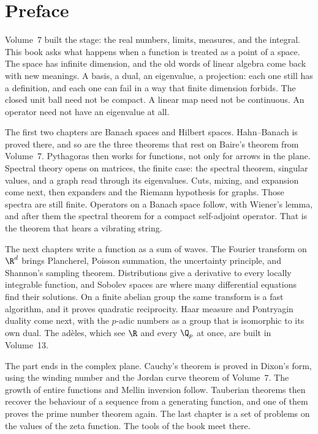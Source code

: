 \chapter*{Preface}
Volume~7 built the stage: the real numbers, limits, measures, and the integral. This book asks what happens when a function is treated as a point of a space. The space has infinite dimension, and the old words of linear algebra come back with new meanings. A basis, a dual, an eigenvalue, a projection: each one still has a definition, and each one can fail in a way that finite dimension forbids. The closed unit ball need not be compact. A linear map need not be continuous. An operator need not have an eigenvalue at all.

The first two chapters are Banach spaces and Hilbert spaces. Hahn--Banach is proved there, and so are the three theorems that rest on Baire's theorem from Volume~7. Pythagoras then works for functions, not only for arrows in the plane. Spectral theory opens on matrices, the finite case: the spectral theorem, singular values, and a graph read through its eigenvalues. Cuts, mixing, and expansion come next, then expanders and the Riemann hypothesis for graphs. Those spectra are still finite. Operators on a Banach space follow, with Wiener's lemma, and after them the spectral theorem for a compact self-adjoint operator. That is the theorem that hears a vibrating string.

The next chapters write a function as a sum of waves. The Fourier transform on $\R^d$ brings Plancherel, Poisson summation, the uncertainty principle, and Shannon's sampling theorem. Distributions give a derivative to every locally integrable function, and Sobolev spaces are where many differential equations find their solutions. On a finite abelian group the same transform is a fast algorithm, and it proves quadratic reciprocity. Haar measure and Pontryagin duality come next, with the $p$-adic numbers as a group that is isomorphic to its own dual. The ad\`eles, which see $\R$ and every $\Q_p$ at once, are built in Volume~13.

The part ends in the complex plane. Cauchy's theorem is proved in Dixon's form, using the winding number and the Jordan curve theorem of Volume~7. The growth of entire functions and Mellin inversion follow. Tauberian theorems then recover the behaviour of a sequence from a generating function, and one of them proves the prime number theorem again. The last chapter is a set of problems on the values of the zeta function. The tools of the book meet there.

